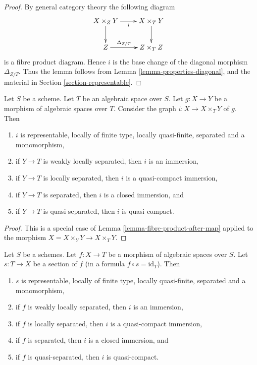 \begin{proof}
By general category theory the following diagram
$$
\xymatrix{
X \times_Z Y \ar[r]_i \ar[d] & X \times_T Y \ar[d] \\
Z \ar[r]^-{\Delta_{Z/T}} \ar[r] & Z \times_T Z
}
$$
is a fibre product diagram. Hence $i$ is the base change of the
diagonal morphism $\Delta_{Z/T}$. Thus the lemma follows
from Lemma \ref{lemma-properties-diagonal}, and the material in
Section \ref{section-representable}.
\end{proof}

\begin{lemma}
\label{lemma-semi-diagonal}
Let $S$ be a scheme. Let $T$ be an algebraic space over $S$.
Let $g : X \to Y$ be a morphism of algebraic spaces over $T$.
Consider the graph $i : X \to X \times_T Y$ of $g$. Then
\begin{enumerate}
\item $i$ is representable, locally of finite type, locally quasi-finite,
separated and a monomorphism,
\item if $Y \to T$ is weakly locally separated, then $i$ is an immersion,
\item if $Y \to T$ is locally separated, then $i$ is a quasi-compact immersion,
\item if $Y \to T$ is separated, then $i$ is a closed immersion, and
\item if $Y \to T$ is quasi-separated, then $i$ is quasi-compact.
\end{enumerate}
\end{lemma}

\begin{proof}
This is a special case of Lemma \ref{lemma-fibre-product-after-map}
applied to the morphism $X = X \times_Y Y \to X\times_T Y$.
\end{proof}

\begin{lemma}
\label{lemma-section-immersion}
Let $S$ be a schemes.
Let $f : X \to T$ be a morphism of algebraic spaces over $S$.
Let $s : T \to X$ be a section of $f$ (in a formula
$f \circ s = \text{id}_T$). Then
\begin{enumerate}
\item $s$ is representable, locally of finite type, locally quasi-finite,
separated and a monomorphism,
\item if $f$ is weakly locally separated, then $i$ is an immersion,
\item if $f$ is locally separated, then $i$ is a quasi-compact immersion,
\item if $f$ is separated, then $i$ is a closed immersion, and
\item if $f$ is quasi-separated, then $i$ is quasi-compact.
\end{enumerate}
\end{lemma}

